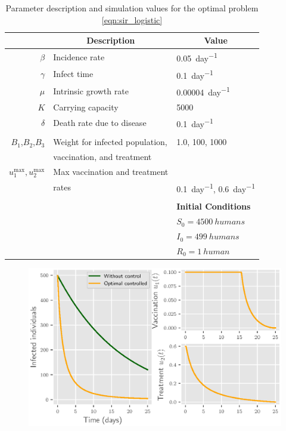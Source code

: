 \begin{table}[htb]
  \begin{center}
    \begin{tabular}{@{}rll@{}} 
      \toprule
      &
      \multicolumn{1}{c}{\textbf{Description}}
      & 
      \multicolumn{1}{c}{\textbf{Value}}
      \\
        \midrule
        $\beta$
          & Incidence rate
          & \SI{0.05}{day^{-1}}
      \\
      $\gamma$
        & Infect time
        & \SI{0.1}{day^{-1}}
      \\
      $\mu$
        & Intrinsic growth rate
        & \SI{0.00004}{day^{-1}}
      \\
        $K$
        & Carrying capacity
        & \num{5000}
      \\
      $\delta$
        & Death rate due to disease
        & \SI{0.1}{day^{-1}}
      \\
      \\  
      $B_1$,$B_2$,$B_3$
        & Weight for infected population,
        & \num{1.0}, \num{100}, \num{1000}
        \\
        & vaccination, and treatment 
      \\
      $u_1^{\max}, u_2^{\max}$
        & Max vaccination and treatment 
        \\
        & rates
        & \SI{0.1}{day^{-1}}, \SI{0.6}{day^{-1}}
      \\
      \\
      && \textbf{Initial Conditions}
      \\
      \cmidrule{3-3}
      && $S_0 = \SI{4500}{humans}$
      \\
      && $I_0 = \SI{499}{humans}$
      \\
      && $R_0 = \SI{1}{human}$
      \\
      \bottomrule
    \end{tabular}
    \caption{Parameter description and simulation values for the optimal problem
      \eqref{eqn:sir_logistic}
    }
    \label{tbl:sir_logistic}
	\end{center}
\end{table}
%
\begin{figure}
  \centering
  \includegraphics{Figures/figure_1_sir_log}
  \caption{}
  \label{fig:figure1sirlog}
\end{figure}


